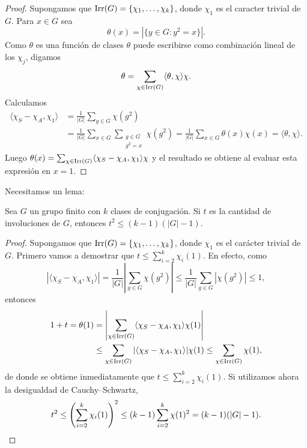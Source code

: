 \begin{proof}
Supongamos que $\operatorname{Irr}(G)=\{\chi_1,\dots,\chi_k\}$, donde $\chi_1$ es el caracter trivial de $G$. 
Para $x\in G$ sea 
\[
\theta(x)=|\{y\in G:y^2=x\}|.
\]
Como $\theta$ es una función de clases
$\theta$ puede escribirse como combinación lineal de los $\chi_j$, digamos
\[
\theta=\sum_{\chi\in\operatorname{Irr}(G)}\langle\theta,\chi\rangle\chi.
\]
Calculamos
\begin{align*}
    \langle\chi_S-\chi_A,\chi_1\rangle 
    &=\frac{1}{|G|}\sum_{g\in G}\chi(g^2)\\
    &=\frac{1}{|G|}\sum_{x\in G}\sum_{\substack{g\in G\\g^2=x}}\chi(g^2)
    =\frac{1}{|G|}\sum_{x\in G}\theta(x)\chi(x)=\langle\theta,\chi\rangle.
\end{align*}
Luego $\theta(x)=\sum_{\chi\in\operatorname{Irr}(G)}\langle\chi_S-\chi_A,\chi_1\rangle\chi$ y el resultado se obtiene
al evaluar esta expresión en $x=1$. 
\end{proof}

Necesitamos un lema:

\begin{lemma}
Sea $G$ un grupo finito con $k$ clases de conjugación. 
Si $t$ es la cantidad de involuciones de $G$, entonces 
$t^2\leq (k-1)(|G|-1)$. 
\end{lemma}

\begin{proof}
Supongamos que $\operatorname{Irr}(G)=\{\chi_1,\dots,\chi_k\}$, donde $\chi_1$ es el 
carácter trivial de $G$. Primero vamos a demostrar que 
$t\leq\sum_{i=2}^k\chi_i(1)$. En efecto, 
como 
\[
|\langle\chi_S-\chi_A,\chi_1\rangle|
=\frac{1}{|G|}\left|\sum_{g\in G}\chi(g^2)\right|
\leq\frac{1}{|G|}\sum_{g\in G}|\chi(g^2)|\leq 1,
\]
entonces 
\begin{align*}
1+t=\theta(1)
&=\left|\sum_{\chi\in\operatorname{Irr}(G)}\langle\chi_S-\chi_A,\chi_1\rangle\chi(1)\right|\\
&\leq\sum_{\chi\in\operatorname{Irr}(G)}|\langle\chi_S-\chi_A,\chi_1\rangle|\chi(1)
\leq\sum_{\chi\in\operatorname{Irr}(G)}\chi(1),
\end{align*}
de donde se obtiene inmediatamente que $t\leq\sum_{i=2}^k\chi_i(1)$. 
Si utilizamos ahora 
la desigualdad de Cauchy--Schwartz, 
\[
t^2\leq\left(\sum_{i=2}^k\chi_i(1)\right)^2
\leq(k-1)\sum_{i=2}^k\chi(1)^2=(k-1)(|G|-1).\qedhere
\]
\end{proof}

